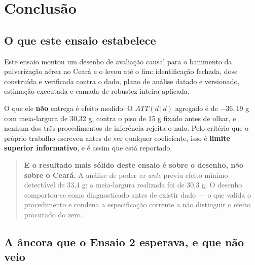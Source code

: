%
%
%
%

\section{Conclusão}
\label{sec:conclusao}

\subsection{O que este ensaio estabelece}
\label{sub:estabelece}

Este ensaio montou um desenho de avaliação causal para o banimento da
pulverização aérea no Ceará e o levou até o fim: identificação fechada, dose
construída e verificada contra o dado, plano de análise datado e versionado,
estimação executada e camada de robustez inteira aplicada.

O que ele \textbf{não} entrega é efeito medido. O \(ATT(d\,|\,d)\) agregado é de
\(-36{,}19\) g com meia-largura de 30,32 g, contra o piso de 15 g fixado antes
de olhar, e nenhum dos três procedimentos de inferência rejeita o nulo. Pelo
critério que o próprio trabalho escreveu antes de ver qualquer coeficiente,
isso é \textbf{limite superior informativo}, e é assim que está reportado.

\begin{quote}
\textbf{E o resultado mais sólido deste ensaio é sobre o desenho, não sobre o
Ceará.} A análise de poder \emph{ex ante} previu efeito mínimo detectável de
33,4 g; a meia-largura realizada foi de 30,3 g. O desenho comportou-se como
diagnosticado antes de existir dado --- o que valida o procedimento e condena a
especificação corrente a não distinguir o efeito procurado do zero.
\end{quote}

\subsection{A âncora que o Ensaio 2 esperava, e que não veio}
\label{sub:ancora}

